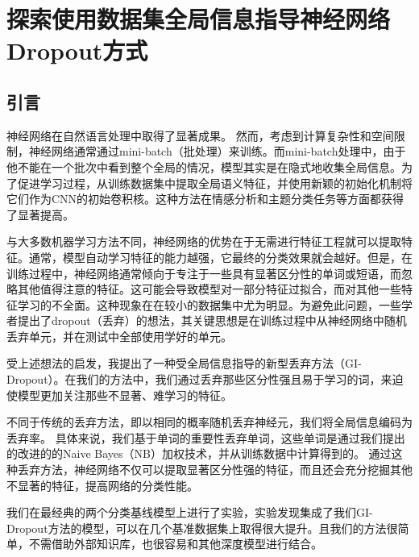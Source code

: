 
\chapter{探索使用数据集全局信息指导神经网络Dropout方式}

\section{引言}
神经网络在自然语言处理中取得了显著成果。
然而，考虑到计算复杂性和空间限制，神经网络通常通过mini-batch（批处理）来训练。而mini-batch处理中，由于他不能在一个批次中看到整个全局的情况，模型其实是在隐式地收集全局信息。为了促进学习过程，从训练数据集中提取全局语义特征，并使用新颖的初始化机制将它们作为CNN的初始卷积核。这种方法在情感分析和主题分类任务等方面都获得了显著提高。

与大多数机器学习方法不同，神经网络的优势在于无需进行特征工程就可以提取特征。通常，模型自动学习特征的能力越强，它最终的分类效果就会越好。但是，在训练过程中，神经网络通常倾向于专注于一些具有显著区分性的单词或短语，而忽略其他值得注意的特征。这可能会导致模型对一部分特征过拟合，而对其他一些特征学习的不全面。这种现象在在较小的数据集中尤为明显。为避免此问题，一些学者提出了dropout（丢弃）的想法，其关键思想是在训练过程中从神经网络中随机丢弃单元，并在测试中全部使用学好的单元\cite{hinton2012improving,srivastava2014dropout}。

受上述想法的启发，我提出了一种受全局信息指导的新型丢弃方法（GI-Dropout）。在我们的方法中，我们通过丢弃那些区分性强且易于学习的词，来迫使模型更加关注那些不显著、难学习的特征。

不同于传统的丢弃方法，即以相同的概率随机丢弃神经元，我们将全局信息编码为丢弃率。
具体来说，我们基于单词的重要性丢弃单词，这些单词是通过我们提出的改进的的Naive Bayes（NB）加权技术，并从训练数据中计算得到的。
通过这种丢弃方法，神经网络不仅可以提取显著区分性强的特征，而且还会充分挖掘其他不显著的特征，提高网络的分类性能。

我们在最经典的两个分类基线模型上进行了实验，实验发现集成了我们GI-Dropout方法的模型，可以在几个基准数据集上取得很大提升。且我们的方法很简单，不需借助外部知识库，也很容易和其他深度模型进行结合。


